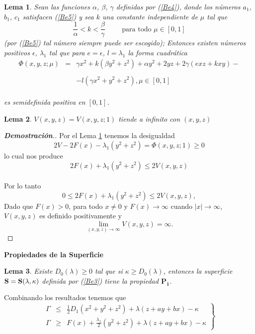 \documentclass[letter]{article}
\newtheorem{lem}{Lema}
\begin{document}
\begin{lem}\label{BL1}Sean las funciones $\alpha$, $\beta$, $\gamma$
definidas por (\ref{Be4}), donde los n{\'u}meros $a_1$, $b_1$, $c_1$
satisfacen (\ref{Be5}) y sea $k$ una constante independiente de
$\mu$ tal que
\begin{equation}\label{Be16}
\displaystyle{\frac{1}{\alpha}}<k<\displaystyle{\frac{\beta}{\gamma}}\hspace{1cm}\textrm{para
todo }\mu\in[0,1]
\end{equation}
(por (\ref{Be5}) tal n{\'u}mero siempre puede ser escogido); Entonces
existen n{\'u}meros positivos $\epsilon$, $\lambda_1$ tal que para
$e=\epsilon$, $l=\lambda_1$ la forma cuadr{\'a}tica
\begin{displaymath}
\begin{array}{lcl}
\Phi(x,y,z;\mu)&=&\gamma x^2+k(\beta y^2+z^2)+\alpha
y^2+2yz+2\gamma(exz+kxy)-\\&&\\&&-l(\gamma x^2+y^2+z^2),
\mu\in[0,1]
\end{array}
\end{displaymath}
\\
es semidefinida positiva en $[0,1]$.
\end{lem}
\begin{lem}$V(x,y,z)=V(x,y,z;1)$ tiende a infinito con $(x,y,z)$
\end{lem}
\begin{proof}[{\bf Demostraci{\'o}n}.]
Por el Lema \ref{BL1} tenemos la desigualdad
\\
$$2V-2 F(x)-\lambda_1(y^2+z^2)=\Phi(x,y,z;1)\geq 0 $$
lo cual nos produce
$$2 F(x)+\lambda_1(y^2+z^2)\leq 2V(x,y,z)$$
\\
Por lo tanto
\begin{equation}\label{Be17}
0\leq 2F(x)+\lambda_1(y^2+z^2)\leq 2V(x,y,z),
\end{equation}
Dado que $F(x)>0$, para todo $x\neq0$ y $F(x)\rightarrow\infty$
cuando $|x|\rightarrow\infty$, $V(x,y,z)$ es definido
positivamente y
$$\lim_{(x,y,z)\rightarrow\infty}V(x,y,z)=\infty .$$
\end{proof}
{\bf\Large{Propiedades de la Superficie }}
\begin{lem}\label{BL2} Existe $D_0(\lambda)\geq 0$ tal que si $\kappa\geq
D_0(\lambda)$, entonces la superficie
${\bf{S}}={\bf{S}}(\lambda,\kappa)$ definida por (\ref{Be3}) tiene
la propiedad $\mathbf{P_1}$.
\end{lem}
Combinando los resultados tenemos que
\begin{equation}\label{Be18}
\left.\begin{array}{lcl} \Gamma&\leq
&\displaystyle{\frac{1}{2}}D_1(x^2+y^2+z^2)+\lambda
(z+ay+bx)-\kappa
\\
\Gamma&\geq &F(x)+
\displaystyle{\frac{\lambda_1}{2}}(y^2+z^2)+\lambda
(z+ay+bx)-\kappa
\end{array}\right\}
\end{equation}
\end{document}
